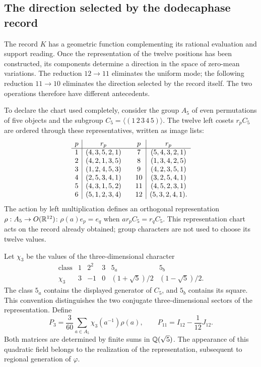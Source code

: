 \subsection{The direction selected by the dodecaphase record}
\label{exc:k-direccion}

The record \(K\) has a geometric function complementing its
rational evaluation and support reading. Once the representation
of the twelve positions has been constructed, its components determine a
direction in the space of zero-mean variations. The reduction
\(12\to11\) eliminates the uniform mode; the following reduction
\(11\to10\) eliminates the direction selected by the record itself.
The two operations therefore have different antecedents.

To declare the chart used completely, consider the group
\(A_5\) of even permutations of five objects and the subgroup
\(C_5=\langle(1\,2\,3\,4\,5)\rangle\). The twelve left cosets
\(r_pC_5\) are ordered through these representatives, written as
image lists:
\[
\begin{array}{c|c@{\qquad}c|c}
p&r_p&p&r_p\\ \hline
1&(4,3,5,2,1)&7&(5,4,3,2,1)\\
2&(4,2,1,3,5)&8&(1,3,4,2,5)\\
3&(1,2,4,5,3)&9&(4,2,3,5,1)\\
4&(2,5,3,4,1)&10&(3,2,5,4,1)\\
5&(4,3,1,5,2)&11&(4,5,2,3,1)\\
6&(5,1,2,3,4)&12&(5,3,2,4,1).
\end{array}
\]
The action by left multiplication defines an orthogonal
representation \(\rho:A_5\to O(\mathbb R^{12})\):
\(\rho(a)e_p=e_q\) when \(ar_pC_5=r_qC_5\).
This representation chart acts on the record already obtained;
group characters are not used to choose its twelve values.

Let \(\chi_3\) be the values of the three-dimensional character
\[
\begin{array}{c|ccccc}
\text{class}&1&2^2&3&5_a&5_b\\ \hline
\chi_3&3&-1&0&(1+\sqrt5)/2&(1-\sqrt5)/2.
\end{array}
\]
The class \(5_a\) contains the displayed generator of \(C_5\), and
\(5_b\) contains its square. This convention distinguishes the two
conjugate three-dimensional sectors of the representation. Define
\begin{equation}
 P_3=\frac3{60}\sum_{a\in A_5}\chi_3(a^{-1})\rho(a),
 \qquad P_{11}=I_{12}-\frac1{12}J_{12}.
 \label{eq:k-proyectores-incidencia}
\end{equation}
Both matrices are determined by finite sums in
\(\mathbb Q(\sqrt5)\). The appearance of this quadratic field belongs
to the realization of the representation, subsequent to regional
generation of \(\varphi\).

